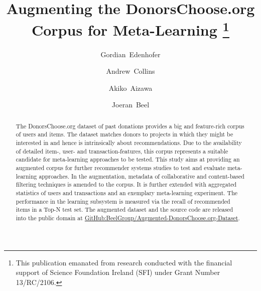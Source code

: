 \documentclass[runningheads]{llncs}
\begin{document}
\title{Augmenting the DonorsChoose.org Corpus for Meta-Learning%
	\thanks{This publication emanated from research conducted with the financial support of Science Foundation Ireland (SFI) under Grant Number 13/RC/2106.}}
\author{Gordian~Edenhofer \and Andrew~Collins \and Akiko~Aizawa \and Joeran~Beel}

\maketitle  %

\begin{abstract}
The DonorsChoose.org dataset of past donations provides a big and feature-rich corpus of users and items. The dataset matches donors to projects in which they might be interested in and hence is intrinsically about recommendations. Due to the availability of detailed item-, user- and transaction-features, this corpus represents a suitable candidate for meta-learning approaches to be tested. This study aims at providing an augmented corpus for further recommender systems studies to test and evaluate meta-learning approaches. In the augmentation, metadata of collaborative and content-based filtering techniques is amended to the corpus. It is further extended with aggregated statistics of users and transactions and an exemplary meta-learning experiment. The performance in the learning subsystem is measured via the recall of recommended items in a Top-N test set. The augmented dataset and the source code are released into the public domain at \href{https://github.com/BeelGroup/Augmented-DonorsChoose.org-Dataset}{GitHub:BeelGroup/Augmented-DonorsChoose.org-Dataset}.

\end{abstract}
\end{document}

